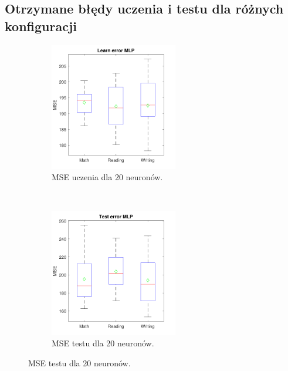 \documentclass[12pt]{article}
\begin{document}
\subsection{Otrzymane błędy uczenia i testu dla różnych konfiguracji}

\begin{figure}[H]
\centering
\begin{subfigure}[t]{0.48\textwidth} 
\centering
\includegraphics[height=2.2in]{purelin_purelin_20_learnBoxplot.pdf}
\caption{MSE uczenia dla 20 neuronów.}
\end{subfigure}
~~
\begin{subfigure}[t]{0.48\textwidth} 
\centering
\includegraphics[height=2.2in]{purelin_purelin_20_testBoxplot.pdf}
\caption{MSE testu dla 20 neuronów.}
\end{subfigure}


\end{figure}
\end{document}
